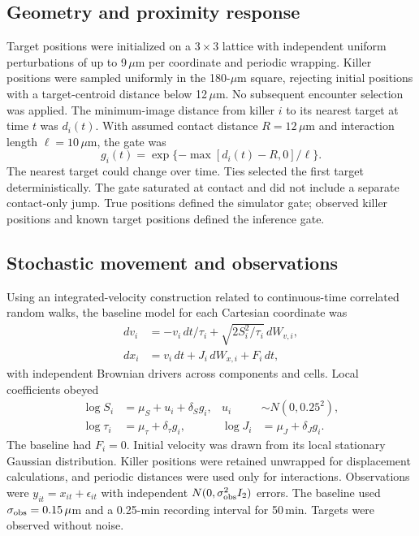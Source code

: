 \documentclass[12pt]{article}
\begin{document}
\subsection*{Geometry and proximity response}
Target positions were initialized on a $3\times3$ lattice with independent uniform perturbations of up to 9\,$\mu$m per coordinate and periodic wrapping. Killer positions were sampled uniformly in the 180-$\mu$m square, rejecting initial positions with a target-centroid distance below 12\,$\mu$m. No subsequent encounter selection was applied. The minimum-image distance from killer $i$ to its nearest target at time $t$ was $d_i(t)$. With assumed contact distance $R=12\,\mu$m and interaction length $\ell=10\,\mu$m, the gate was
\begin{equation}
 g_i(t)=\exp\{-\max[d_i(t)-R,0]/\ell\}.
\end{equation}
The nearest target could change over time. Ties selected the first target deterministically. The gate saturated at contact and did not include a separate contact-only jump. True positions defined the simulator gate; observed killer positions and known target positions defined the inference gate.

\subsection*{Stochastic movement and observations}
Using an integrated-velocity construction related to continuous-time correlated random walks\citep{johnson2008}, the baseline model for each Cartesian coordinate was
\begin{align}
 dv_i&=-v_i\,dt/\tau_i+\sqrt{2S_i^2/\tau_i}\,dW_{v,i},\\
 dx_i&=v_i\,dt+J_i\,dW_{x,i}+F_i\,dt,
\end{align}
with independent Brownian drivers across components and cells. Local coefficients obeyed
\begin{align}
 \log S_i&=\mu_S+u_i+\delta_Sg_i,&u_i&\sim N(0,0.25^2),\\
 \log\tau_i&=\mu_\tau+\delta_\tau g_i,&
 \log J_i&=\mu_J+\delta_Jg_i.
\end{align}
The baseline had $F_i=0$. Initial velocity was drawn from its local stationary Gaussian distribution. Killer positions were retained unwrapped for displacement calculations, and periodic distances were used only for interactions. Observations were $y_{it}=x_{it}+\epsilon_{it}$ with independent $N(0,\sigma_{\rm obs}^2I_2)$ errors. The baseline used $\sigma_{\rm obs}=0.15\,\mu$m and a 0.25-min recording interval for 50\,min. Targets were observed without noise.
\end{document}
